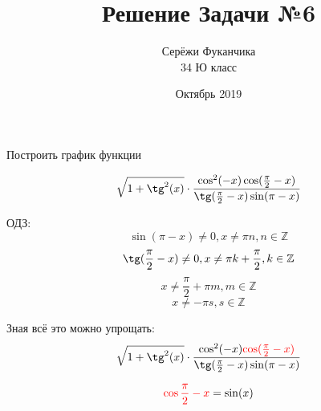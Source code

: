 \documentclass{article}
\title{Решение Задачи №6}
\author{Серёжи Фуканчика\\34 Ю класс}
\date{Октябрь 2019}
\begin{document}
\maketitle
Построить график функции

$$\sqrt{1+\tg^2(x)}\cdot\frac{\cos^2(-x)\cos(\frac{\pi}{2}-x)}{\tg(\frac{\pi}{2}-x)\sin(\pi-x)}$$

ОДЗ:
$$\sin(\pi-x) \ne 0, x \ne \pi{}n, n\in{}\mathbb{Z}$$ $$\tg(\frac{\pi}{2}-x) \ne 0, x\ne\pi{}k+\frac{\pi}{2}, k\in{}\mathbb{Z}$$
$$x\ne\frac{\pi}{2}+\pi{}m, m\in{}\mathbb{Z}$$
$$x\ne-\pi{}s, s\in{}\mathbb{Z}$$

Зная всё это можно упрощать:
$$\sqrt{1+\tg^2(x)}\cdot\frac{\cos^2(-x){\color{red}\cos(\frac{\pi}{2}-x)}}{\tg(\frac{\pi}{2}-x)\sin(\pi-x)}$$

$${\color{red}\cos{\frac{\pi}{2}-x}}=\sin(x)$$
\end{document}
